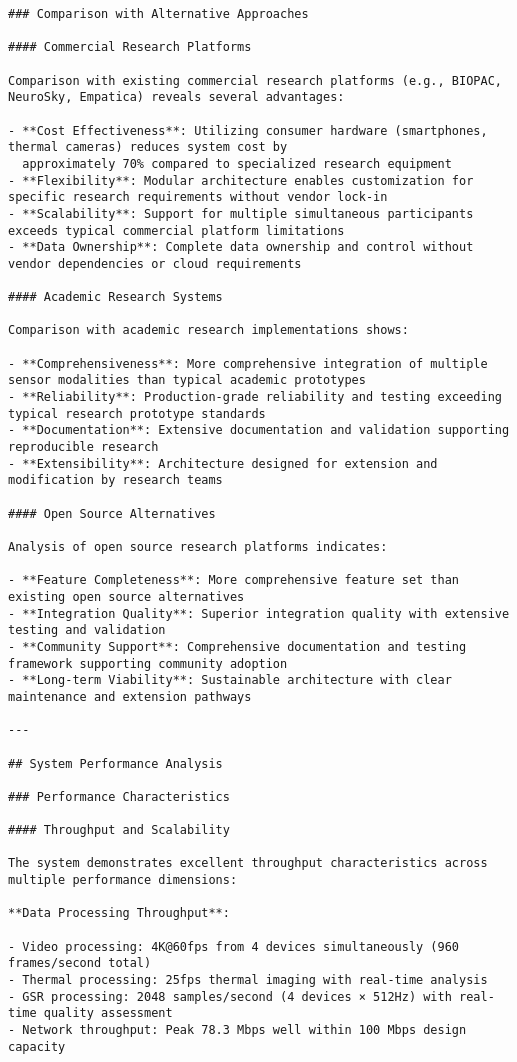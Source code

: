 \documentclass[12pt,a4paper]{report}
\begin{document}
\begin{verbatim}
### Comparison with Alternative Approaches

#### Commercial Research Platforms

Comparison with existing commercial research platforms (e.g., BIOPAC, NeuroSky, Empatica) reveals several advantages:

- **Cost Effectiveness**: Utilizing consumer hardware (smartphones, thermal cameras) reduces system cost by
  approximately 70% compared to specialized research equipment
- **Flexibility**: Modular architecture enables customization for specific research requirements without vendor lock-in
- **Scalability**: Support for multiple simultaneous participants exceeds typical commercial platform limitations
- **Data Ownership**: Complete data ownership and control without vendor dependencies or cloud requirements

#### Academic Research Systems

Comparison with academic research implementations shows:

- **Comprehensiveness**: More comprehensive integration of multiple sensor modalities than typical academic prototypes
- **Reliability**: Production-grade reliability and testing exceeding typical research prototype standards
- **Documentation**: Extensive documentation and validation supporting reproducible research
- **Extensibility**: Architecture designed for extension and modification by research teams

#### Open Source Alternatives

Analysis of open source research platforms indicates:

- **Feature Completeness**: More comprehensive feature set than existing open source alternatives
- **Integration Quality**: Superior integration quality with extensive testing and validation
- **Community Support**: Comprehensive documentation and testing framework supporting community adoption
- **Long-term Viability**: Sustainable architecture with clear maintenance and extension pathways

---

## System Performance Analysis

### Performance Characteristics

#### Throughput and Scalability

The system demonstrates excellent throughput characteristics across multiple performance dimensions:

**Data Processing Throughput**:

- Video processing: 4K@60fps from 4 devices simultaneously (960 frames/second total)
- Thermal processing: 25fps thermal imaging with real-time analysis
- GSR processing: 2048 samples/second (4 devices × 512Hz) with real-time quality assessment
- Network throughput: Peak 78.3 Mbps well within 100 Mbps design capacity


\end{verbatim}
\end{document}
